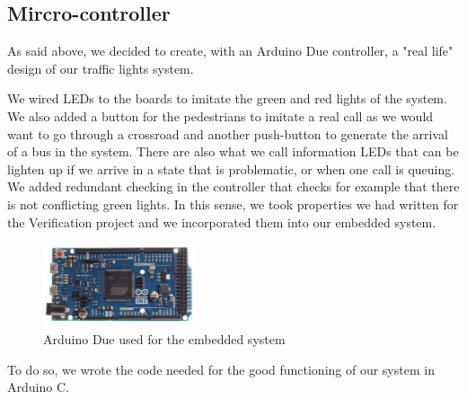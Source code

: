 \subsection{Mircro-controller}
As said above, we decided to create, with an Arduino Due controller, a "real life" design of our traffic lights system.

We wired LEDs to the boards to imitate the green and red lights of the system. We also added a button for the pedestrians to imitate a real call as we would want to go through a crossroad and another push-button to generate the arrival of a bus in the system. There are also what we call information LEDs that can be lighten up if we arrive in a state that is problematic, or when one call is queuing. 
We added redundant checking in the controller that checks for example that there is not conflicting green lights. In this sense, we took properties we had written for the Verification project and we incorporated them into our embedded system.

\begin{figure}[H]
	\label{fig:arduino}
  	\centering
    \includegraphics[width=0.4\textwidth]{picture/arduino.jpg}
    \caption{Arduino Due used for the embedded system}
\end{figure} 

To do so, we wrote the code needed for the good functioning of our system in Arduino C.
